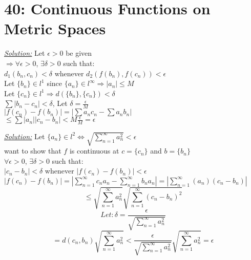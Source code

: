 \documentclass{article}
\begin{document}
\section*{40: Continuous Functions on Metric Spaces}

\begin{tcolorbox}[enhanced,attach boxed title to top center={yshift=-3mm,yshifttext=-1mm},
  colback=blue!5!white,colframe=blue!75!black,colbacktitle=red!80!black,
  title=Exercise 40.10:,fonttitle=\bfseries,
  boxed title style={size=small,colframe=red!50!black} ]
     \textit{\color{blue}\underline{Solution:}}
Let $\epsilon >0$ be given\\
$\Rightarrow \forall \epsilon>0$, $\exists \delta>0$ such that:\\
$d_1 (b_n,c_n)<\delta$ whenever $d_2 (f(b_n),f(c_n))<\epsilon$\\
Let $\{b_n\}\in l^1$ since $\{a_n\}\in l^\infty\Rightarrow |a_n|\leq M$\\
Let $\{c_n\}\in l^1\Rightarrow d(\{b_n\},\{c_n\})<\delta$\\
$\sum|b_n-c_n|<\delta$, Let $\delta=\frac{\epsilon}{M}$\\
$|f(c_n)-f(b_n)|=|\sum a_n c_n-\sum a_n b_n|$\\
$\leq\sum |a_n||c_n-b_n|<M\frac{\epsilon}{M}=\epsilon$
\end{tcolorbox}



\begin{tcolorbox}[enhanced,attach boxed title to top center={yshift=-3mm,yshifttext=-1mm},
  colback=blue!5!white,colframe=blue!75!black,colbacktitle=red!80!black,
  title=Exercise 40.11:,fonttitle=\bfseries,
  boxed title style={size=small,colframe=red!50!black} ]
     \textit{\color{blue}\underline{Solution:}}
Let $\{a_n\} \in l^2\iff \sqrt{\sum_{n=1}^{\infty} a_n ^2}<\epsilon$\\
want to show that $f$ is continuous at $c=\{c_n\}$ and $b=\{b_n\}$\\
$\forall\epsilon>0$, $\exists\delta>0$ such that:\\
$|c_n-b_n|<\delta$ whenever $|f(c_n)-f(b_n)|<\epsilon$\\
$|f(c_n)-f(b_n)|=|\sum_{n=1}^{\infty}c_n a_n-\sum_{n=1}^{\infty}b_n a_n|=|\sum_{n=1}^{\infty}(a_n)(c_n-b_n)|$\\
$$\leq\sqrt{\sum_{n=1}^{\infty} a_n^2}\sqrt{\sum_{n=1}^{\infty}(c_n-b_n)^2}$$
{\color{red}$$Let:\delta=\frac{\epsilon}{\sqrt{\sum_{n=1}^{\infty}a_n^2}}$$}
$$=d(c_n,b_n)\sqrt{\sum_{n=1}^{\infty} a_n^2}<\frac{\epsilon}{\sqrt{\sum_{n=1}^{\infty} a_n^2}}\sqrt{\sum_{n=1}^{\infty} a_n^2}=\epsilon$$
\end{tcolorbox}
\end{document}
